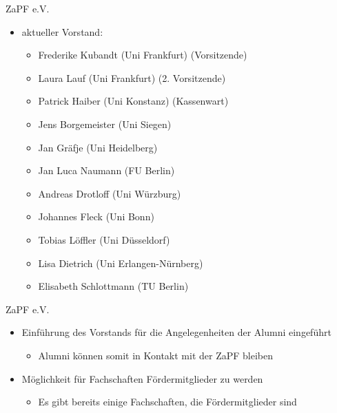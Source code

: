 \documentclass[compress, aspectratio=169]{beamer}
\begin{document}
\begin{frame}{ZaPF e.V.}       
    \begin{itemize}                         
        \item[] aktueller Vorstand:                           
        \begin{itemize}                          
             \item Frederike Kubandt (Uni Frankfurt) (Vorsitzende)                           
             \item Laura Lauf (Uni Frankfurt) (2. Vorsitzende)                           
             \item Patrick Haiber (Uni Konstanz) (Kassenwart)                           
             \item Jens Borgemeister (Uni Siegen)                           
             \item Jan Gräfje (Uni Heidelberg)                           
             \item Jan Luca Naumann (FU Berlin)                           
             \item Andreas Drotloff (Uni Würzburg)                           
             \item Johannes Fleck (Uni Bonn)
             \item Tobias Löffler (Uni Düsseldorf)                           
             \item Lisa Dietrich (Uni Erlangen-Nürnberg)                          
             \item Elisabeth Schlottmann (TU Berlin)
        \end{itemize}                         
    \end{itemize}                       
\end{frame}                        
                      
                      
\begin{frame}{ZaPF e.V.}                        
     \begin{itemize}                          
     \item Einführung des Vorstands für die Angelegenheiten der Alumni eingeführt                       
      \begin{itemize}
      \item Alumni können somit in Kontakt mit der ZaPF bleiben
      \end{itemize}
      \item Möglichkeit für Fachschaften Fördermitglieder zu werden
      \begin{itemize}
      \item Es gibt bereits einige Fachschaften, die Fördermitglieder sind
      \end{itemize}
      \end{itemize}
\end{frame}            
\end{document}
